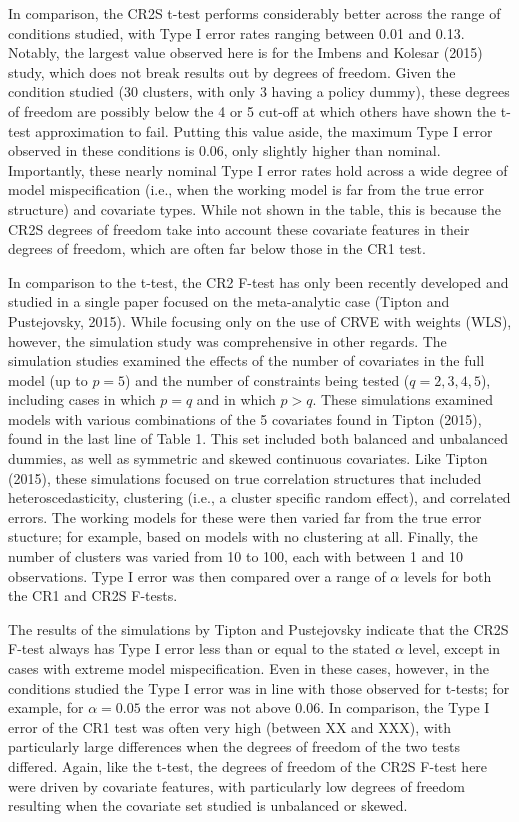 \documentclass[12pt]{article}\usepackage[]{graphicx}\usepackage[]{color}
\begin{document}
In comparison, the CR2S t-test performs considerably better across the range of conditions studied, with Type I error rates ranging between 0.01 and 0.13.
Notably, the largest value observed here is for the Imbens and Kolesar (2015) study, which does not break results out by degrees of freedom. 
Given the condition studied (30 clusters, with only 3 having a policy dummy), these degrees of freedom are possibly below the 4 or 5 cut-off at which others have shown the t-test approximation to fail. 
Putting this value aside, the maximum Type I error observed in these conditions is 0.06, only slightly higher than nominal.
Importantly, these nearly nominal Type I error rates hold across a wide degree of model mispecification (i.e., when the working model is far from the true error structure) and covariate types.
While not shown in the table, this is because the CR2S degrees of freedom take into account these covariate features in their degrees of freedom, which are often far below those in the CR1 test.


In comparison to the t-test, the CR2 F-test has only been recently developed and studied in a single paper focused on the meta-analytic case (Tipton and Pustejovsky, 2015).
While focusing only on the use of CRVE with weights (WLS), however, the simulation study was comprehensive in other regards.
The simulation studies examined the effects of the number of covariates in the full model (up to $p = 5$) and the number of constraints being tested ($q = 2,3,4,5$), including cases in which $p = q$ and in which $p > q$. 
These simulations examined models with various combinations of the 5 covariates found in Tipton (2015), found in the last line of Table 1. 
This set included both balanced and unbalanced dummies, as well as symmetric and skewed continuous covariates.
Like Tipton (2015), these simulations focused on true correlation structures that included heteroscedasticity, clustering (i.e., a cluster specific random effect), and correlated errors.
The working models for these were then varied far from the true error stucture; for example, based on models with no clustering at all.
Finally, the number of clusters was varied from 10 to 100, each with between 1 and 10 observations. 
Type I error was then compared over a range of $\alpha$ levels for both the CR1 and CR2S F-tests.

The results of the simulations by Tipton and Pustejovsky indicate that the CR2S F-test always has Type I error less than or equal to the stated $\alpha$ level, except in cases with extreme model mispecification. 
Even in these cases, however, in the conditions studied the Type I error was in line with those observed for t-tests; for example, for $\alpha = 0.05$ the error was not above 0.06. 
In comparison, the Type I error of the CR1 test was often very high (between XX and XXX), with particularly large differences when the degrees of freedom of the two tests differed.
Again, like the t-test, the degrees of freedom of the CR2S F-test here were driven by covariate features, with particularly low degrees of freedom resulting when the covariate set studied is unbalanced or skewed.
\end{document}
